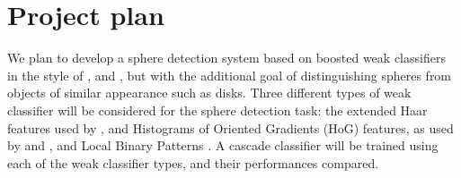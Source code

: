\documentclass[11pt]{scrartcl}
\begin{document}
    \section{Project plan} {
    \label{sec:plan}



        We plan to develop a sphere detection system based on boosted weak
        classifiers in the style of \citeauthor{zhang2013novel}, and
        \citeauthor{masselli2013haar}, but with the additional goal of
        distinguishing spheres from objects of similar appearance such as
        disks. %
        Three different types of weak classifier will be considered for the sphere detection task: the extended Haar features used by \citet{zhang2013novel},
        and Histograms of Oriented Gradients (HoG) features,
        as used by \citet{dalal2005histograms} and \citet{zhu2006hogs}, and Local Binary Patterns \citep{liao2007learning}.
        A cascade classifier will be trained using each of the weak classifier types, and their performances compared.


}
\end{document}

